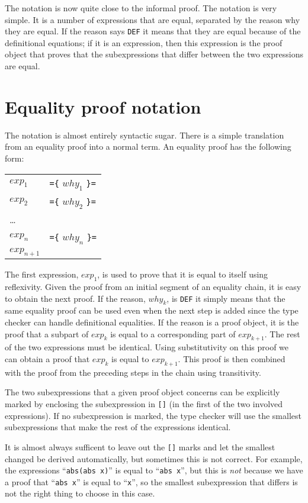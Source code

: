 \documentclass{llncs}[12pt]             %
\newcommand{\te}[1]{{\tt #1}}
\begin{document}
The notation is now quite close to the informal proof.  The notation is very simple.
It is a number of expressions that are equal, separated by the reason why they are equal.
If the reason says \te{DEF} it means that they are equal because of the definitional
equations; if it is an expression, then this expression is the proof object
that proves that the subexpressions that differ between the two expressions are equal.

\section{Equality proof notation}
The notation is almost entirely syntactic sugar.  There is a simple translation
from an equality proof into a normal term.
An equality proof has the following form:

\begin{tabular}{ll}
$exp_1$ & \te{=\{} $why_1$ \te{\}=} \\
$exp_2$ & \te{=\{} $why_2$ \te{\}=} \\
\ldots& \\
$exp_n$ & \te{=\{} $why_n$ \te{\}=} \\
$exp_{n+1}$ \\
\end{tabular}

The first expression, $exp_1$, is used to prove that it is equal to itself
using reflexivity.  Given the proof from an initial segment of an 
equality chain, it is easy to obtain the next proof.  If the reason,
$why_k$, is \te{DEF} it simply means that the same equality proof can be used 
even when the next step is added since the type checker can handle
definitional equalities.
If the reason is a proof object, it is the proof that a subpart of $exp_k$
is equal to a corresponding part of $exp_{k+1}$.  The rest of the two expressions
must be identical.  Using substitutivity on this proof we can obtain a proof
that $exp_k$ is equal to $exp_{k+1}$.  This proof is then combined with the
proof from the preceding steps in the chain using transitivity.

The two subexpressions that a given proof object concerns can be explicitly
marked by enclosing the subexpression in \te{[]} (in the first of the two involved
expressions).  If no subexpression is
marked, the type checker will use the smallest subexpressions that make the rest
of the expressions identical.

It is almost always sufficent to leave out the \te{[]} marks and let the
smallest changed be derived automatically, but sometimes this is not
correct.  For example, the expressions ``\te{abs(abs x)}'' is equal to
``\te{abs x}'', but this is {\em not} because we have a proof that
``\te{abs x}'' is equal to ``\te{x}'', so the smallest subexpression that
differs is not the right thing to choose in this case.
\end{document}
